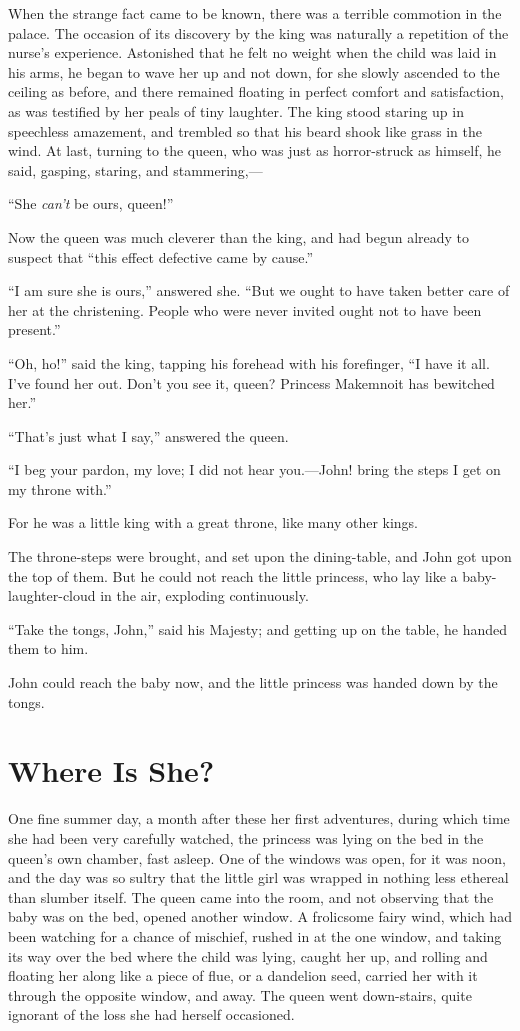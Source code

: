 \documentclass[12pt]{memoir}
\begin{document}
When the strange fact came to be known, there was a terrible commotion
in the palace.  The occasion of its discovery by the king was
naturally a repetition of the nurse's experience.  Astonished that he
felt no weight when the child was laid in his arms, he began to wave
her up and not down, for she slowly ascended to the ceiling as before,
and there remained floating in perfect comfort and satisfaction, as
was testified by her peals of tiny laughter.  The king stood staring
up in speechless amazement, and trembled so that his beard shook like
grass in the wind.  At last, turning to the queen, who was just as
horror-struck as himself, he said, gasping, staring, and
stammering,---

``She \emph{can't} be ours, queen!''

Now the queen was much cleverer than the king, and had begun already
to suspect that ``this effect defective came by cause.''

``I am sure she is ours,'' answered she.  ``But we ought to have taken
better care of her at the christening.  People who were never invited
ought not to have been present.''

``Oh, ho!'' said the king, tapping his forehead with his forefinger,
``I have it all.  I've found her out.  Don't you see it, queen?
Princess Makemnoit has bewitched her.''

``That's just what I say,'' answered the queen.

``I beg your pardon, my love; I did not hear you.---John! bring the
steps I get on my throne with.''

For he was a little king with a great throne, like many other kings.

The throne-steps were brought, and set upon the dining-table, and John
got upon the top of them.  But he could not reach the little princess,
who lay like a baby-laughter-cloud in the air, exploding continuously.

``Take the tongs, John,'' said his Majesty; and getting up on the
table, he handed them to him.

John could reach the baby now, and the little princess was handed down
by the tongs.


\chapter{Where Is She?}


One fine summer day, a month after these her first adventures, during
which time she had been very carefully watched, the princess was lying
on the bed in the queen's own chamber, fast asleep.  One of the
windows was open, for it was noon, and the day was so sultry that the
little girl was wrapped in nothing less ethereal than slumber itself.
The queen came into the room, and not observing that the baby was on
the bed, opened another window.  A frolicsome fairy wind, which had
been watching for a chance of mischief, rushed in at the one window,
and taking its way over the bed where the child was lying, caught her
up, and rolling and floating her along like a piece of flue, or a
dandelion seed, carried her with it through the opposite window, and
away.  The queen went down-stairs, quite ignorant of the loss she had
herself occasioned.
\end{document}
